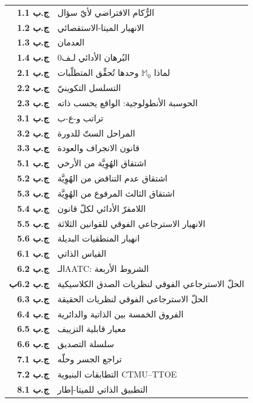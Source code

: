 \documentclass[10pt, openany, oneside]{book}
\renewcommand{\footnotesize}{\fontsize{8.5}{11}\selectfont}
\begin{document}
{\footnotesize
\noindent\begin{tabular}{r p{}}
\textbf{ج.ب 1.1} & الرُّكام الافتراضي لأيّ سؤال \\[0.2em]
\textbf{ج.ب 1.2} & الانهيار الميتا-الاستقصائي \\[0.2em]
\textbf{ج.ب 1.3} & العدمان \\[0.2em]
\textbf{ج.ب 1.4} & البُرهان الأدائي لـف0 \\[0.2em]
\textbf{ج.ب 2.1} & لماذا $\mathbb{M}_0$ وحدها تُحقِّق المتطلّبات \\[0.2em]
\textbf{ج.ب 2.2} & التسلسل التكوينيّ \\[0.2em]
\textbf{ج.ب 2.3} & الحوسبة الأنطولوجية: الواقع يحسب ذاته \\[0.2em]
\textbf{ج.ب 3.1} & تراتب و-ع-ب \\[0.2em]
\textbf{ج.ب 3.2} & المراحل الستّ للدورة \\[0.2em]
\textbf{ج.ب 3.3} & قانون الانجراف والعودة \\[0.2em]
\textbf{ج.ب 5.1} & اشتقاق الهُوِيَّة من الأرخي \\[0.2em]
\textbf{ج.ب 5.2} & اشتقاق عدم التناقض من الهُوِيَّة \\[0.2em]
\textbf{ج.ب 5.3} & اشتقاق الثالث المرفوع من الهُوِيَّة \\[0.2em]
\textbf{ج.ب 5.4} & اللامفرّ الأدائي لكلّ قانون \\[0.2em]
\textbf{ج.ب 5.5} & الانهيار الاسترجاعي الفوقي للقوانين الثلاثة \\[0.2em]
\textbf{ج.ب 5.6} & انهيار المنطقيات البديلة \\[0.2em]
\textbf{ج.ب 6.1} & القياس الذاتي \\[0.2em]
\textbf{ج.ب 6.2} & الـAATC: الشروط الأربعة \\[0.2em]
\textbf{ج.ب 6.2ب} & الحلّ الاسترجاعي الفوقي لنظريات الصدق الكلاسيكية \\[0.2em]
\textbf{ج.ب 6.3} & الحلّ الاسترجاعي الفوقي لنظريات الحقيقة \\[0.2em]
\textbf{ج.ب 6.4} & الفروق الخمسة بين الذاتية والدائرية \\[0.2em]
\textbf{ج.ب 6.5} & معيار قابلية التزييف \\[0.2em]
\textbf{ج.ب 6.6} & سلسلة التصديق \\[0.2em]
\textbf{ج.ب 7.1} & تراجع الجسر وحلّه \\[0.2em]
\textbf{ج.ب 7.2} & التطابقات البنيوية CTMU--TTOE \\[0.2em]
\textbf{ج.ب 8.1} & التطبيق الذاتي للميتا-إطار \\[0.2em]

\end{tabular}}
\end{document}
